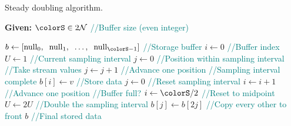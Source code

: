 \begin{algorithm}[H]
\caption{Steady doubling algorithm.}
\label{alg:steady-doubling}
\begin{minipage}{0.5\textwidth}
    \hspace*{\algorithmicindent} \textbf{Given:} $\colorS \in 2\mathcal{N}$ \textcolor{teal}{\small//Buffer size (even integer)}
    \hspace*{\algorithmicindent}    \begin{algorithmic}[1]
        \State $b \gets [\mathrm{null}_0,\;\; \mathrm{null}_1,\;\; \ldots,\;\; \mathrm{null}_{\colorS - 1}]$ \textcolor{teal}{\small//Storage buffer}
        \State $i \gets 0$ \textcolor{teal}{\small//Buffer index}
        \State $U \gets 1$ \textcolor{teal}{\small//Current sampling interval}
        \State $j \gets 0$ \textcolor{teal}{\small//Position within sampling interval}
         \textcolor{teal}{\small//Take stream values}
        \State $j \gets j + 1$  \textcolor{teal}{\small//Advance one position}
          \textcolor{teal}{\small//Sampling interval complete}
        \State $b[i] \gets v$ \textcolor{teal}{\small//Store data}
        \State $j \gets 0$  \textcolor{teal}{\small//Reset sampling interval}
        \State $i \gets i + 1$  \textcolor{teal}{\small//Advance one position}
         \textcolor{teal}{\small//Buffer full?}
        \State $i \gets \colorS / 2$ \textcolor{teal}{\small//Reset to midpoint}
        \State $U \gets 2U$ \textcolor{teal}{\small//Double the sampling interval}
        \For{$j \in [0\twodots \colorS/2)$}
        \State $b[j] \gets b[2j]$ \textcolor{teal}{\small//Copy every other to front}
        \EndFor
        \EndIf
        \EndIf
        \EndFor
        \Return $b$ \textcolor{teal}{\small//Final stored data}
    \end{algorithmic}
\end{minipage}
\end{algorithm}
